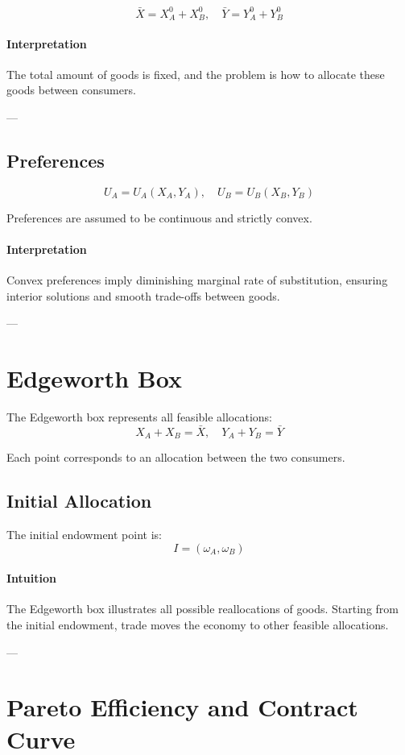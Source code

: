 \[
\bar{X} = X_A^0 + X_B^0, \quad
\bar{Y} = Y_A^0 + Y_B^0
\]

\paragraph{Interpretation}
The total amount of goods is fixed, and the problem is how to allocate these goods
between consumers.

---

\subsection{Preferences}

\[
U_A = U_A(X_A, Y_A), \quad
U_B = U_B(X_B, Y_B)
\]

Preferences are assumed to be continuous and strictly convex.

\paragraph{Interpretation}
Convex preferences imply diminishing marginal rate of substitution, ensuring
interior solutions and smooth trade-offs between goods.

---

\section{Edgeworth Box}

The Edgeworth box represents all feasible allocations:
\[
X_A + X_B = \bar{X}, \quad
Y_A + Y_B = \bar{Y}
\]

Each point corresponds to an allocation between the two consumers.

\subsection{Initial Allocation}

The initial endowment point is:
\[
I = (\omega_A, \omega_B)
\]

\paragraph{Intuition}
The Edgeworth box illustrates all possible reallocations of goods.  
Starting from the initial endowment, trade moves the economy to other feasible allocations.

---

\section{Pareto Efficiency and Contract Curve}

